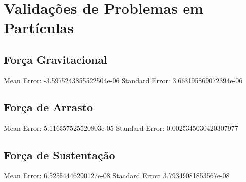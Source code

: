 \section{\textbf{Validações de Problemas em Partículas}}
\subsection{\textbf{Força Gravitacional}}

Mean Error: -3.5975243855522504e-06
Standard Error: 3.663195869072394e-06
\subsection{\textbf{Força de Arrasto}}

Mean Error: 5.116557525520803e-05
Standard Error: 0.0025345030420307977
\subsection{\textbf{Força de Sustentação}}

Mean Error: 6.52554446290127e-08
Standard Error: 3.79349081853567e-08